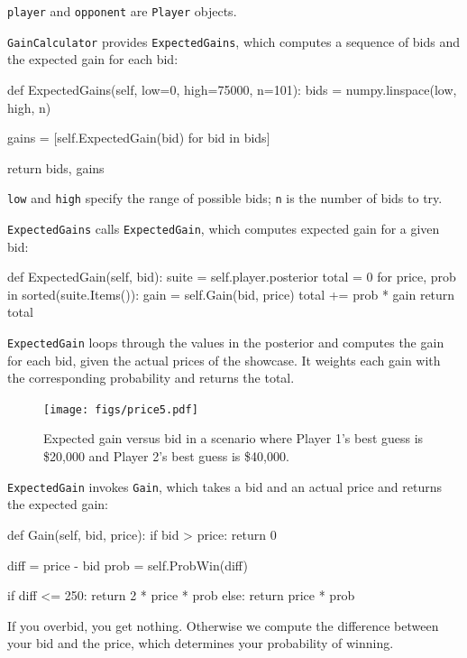 \documentclass[12pt]{book}
\theoremstyle{exercise}
\begin{document}
{\tt player} and {\tt opponent} are {\tt Player} objects.

{\tt GainCalculator} provides {\tt ExpectedGains}, which
computes a sequence of bids and the expected gain for each
bid:

\begin{code}
    def ExpectedGains(self, low=0, high=75000, n=101):
        bids = numpy.linspace(low, high, n)

        gains = [self.ExpectedGain(bid) for bid in bids]

        return bids, gains
\end{code}

{\tt low} and {\tt high} specify the range of possible bids;
{\tt n} is the number of bids to try.  

{\tt ExpectedGains} calls {\tt ExpectedGain}, which
computes expected gain for a given bid:

\begin{code}
    def ExpectedGain(self, bid):
        suite = self.player.posterior
        total = 0
        for price, prob in sorted(suite.Items()):
            gain = self.Gain(bid, price)
            total += prob * gain
        return total
\end{code}

{\tt ExpectedGain} loops through the values in the posterior
and computes the gain for each bid, given the actual prices of
the showcase.  It weights each gain with the corresponding
probability and returns the total.

\begin{figure}
\centerline{\texttt{[image: figs/price5.pdf]}}
\caption{Expected gain versus bid in a scenario where Player 1's best 
guess is \$20,000 and Player 2's best guess is \$40,000.}
\label{fig.price5}
\end{figure}

{\tt ExpectedGain} invokes {\tt Gain}, which takes a bid and an actual
price and returns the expected gain:

\begin{code}
    def Gain(self, bid, price):
        if bid > price:
            return 0

        diff = price - bid
        prob = self.ProbWin(diff)

        if diff <= 250:
            return 2 * price * prob
        else:
            return price * prob
\end{code}

If you overbid, you get nothing.  Otherwise we compute 
the difference between your bid and the price, which determines
your probability of winning.
\end{document}
